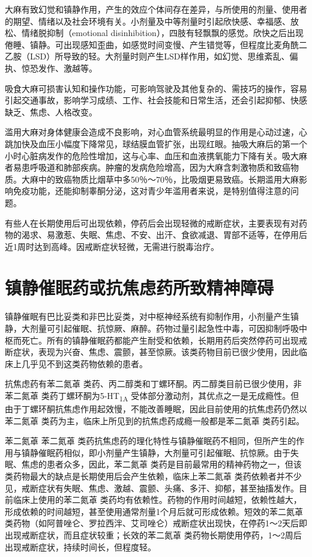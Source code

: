 大麻有致幻觉和镇静作用，产生的效应个体间存在差异，与所使用的剂量、使用者的期望、情绪以及社会环境有关。小剂量及中等剂量时引起欣快感、幸福感、放松、情绪脱抑制（emotional
disinhibition），四肢有轻飘飘的感觉。欣快之后出现倦睡、镇静。可出现感知歪曲，如感觉时间变慢、产生错觉等，但程度比麦角酰二乙胺（LSD）所导致的轻。大剂量时则产生LSD样作用，如幻觉、思维紊乱、偏执、惊恐发作、激越等。

吸食大麻可损害认知和操作功能，可影响驾驶及其他复杂的、需技巧的操作，容易引起交通事故，影响学习成绩、工作、社会技能和日常生活，还会引起抑郁、快感缺乏、焦虑、人格改变。

滥用大麻对身体健康会造成不良影响，对心血管系统最明显的作用是心动过速，心跳加快及血压小幅度下降常见，球结膜血管扩张，出现红眼。抽吸大麻后的第一个小时心脏病发作的危险性增加，这与心率、血压和血液携氧能力下降有关。吸大麻者易患呼吸道和肺部疾病。肿瘤的发病危险增高，因为大麻含刺激物质和致癌物质。大麻中的致癌物质比烟草中多50％～70％，比吸烟更易致癌。长期滥用大麻影响免疫功能，还能抑制睾酮分泌，这对青少年滥用者来说，是特别值得注意的问题。

有些人在长期使用后可出现依赖，停药后会出现轻微的戒断症状，主要表现有对药物的渴求、易激惹、失眠、焦虑、不安、出汗、食欲减退、胃部不适等，在停用后近1周时达到高峰。因戒断症状轻微，无需进行脱毒治疗。

\section{镇静催眠药或抗焦虑药所致精神障碍}

镇静催眠有巴比妥类和非巴比妥类，对中枢神经系统有抑制作用，小剂量产生镇静，大剂量可引起催眠、抗惊厥、麻醉。药物过量引起急性中毒，可因抑制呼吸中枢而死亡。所有的镇静催眠药都能产生耐受和依赖，长期用药后突然停药可出现戒断症状，表现为兴奋、焦虑、震颤，甚至惊厥。该类药物目前已很少使用，因此临床上几乎见不到这类药物依赖的患者。

抗焦虑药有苯二氮䓬
类药、丙二醇类和丁螺环酮。丙二醇类目前已很少使用，非苯二氮䓬
类药丁螺环酮为5-HT\textsubscript{1A}
受体部分激动剂，其优点之一是无成瘾性。但由于丁螺环酮抗焦虑作用起效慢，不能改善睡眠，因此目前使用的抗焦虑药仍然以苯二氮䓬
类药为主，临床上所见到的抗焦虑药成瘾一般都是苯二氮䓬
类药引起。

苯二氮䓬
苯二氮䓬
类药抗焦虑药的理化特性与镇静催眠药不相同，但所产生的作用与镇静催眠药相似，即小剂量产生镇静，大剂量可引起催眠、抗惊厥。由于失眠、焦虑的患者众多，因此，苯二氮䓬
类药是目前最常用的精神药物之一，但该类药物最大的缺点是长期使用后会产生依赖，临床上苯二氮䓬
类药依赖者并不少见，戒断症状有失眠、焦虑、激越、震颤、头痛、多汗、抑郁，甚至抽搐发作。目前临床上使用的苯二氮䓬
类药均有依赖性。药物的作用时间越短，依赖性越大，形成依赖的时间越短，甚至使用通常剂量1个月后就可形成依赖。短效的苯二氮䓬
类药物（如阿普唑仑、罗拉西泮、艾司唑仑）戒断症状出现快，在停药1～2天后即出现戒断症状，而且症状较重；长效的苯二氮䓬
类药物长期使用停药，1～2周后出现戒断症状，持续时间长，但程度轻。

